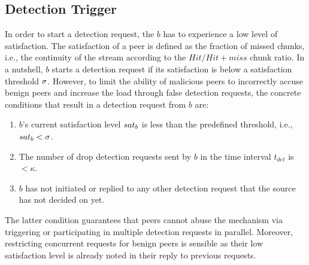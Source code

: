 \subsection{Detection Trigger}
\label{Detection-Trigger}


In order to start a detection request, the $b$ has to experience a low level of satisfaction. 
The satisfaction of a peer is defined as the fraction of missed chunks, i.e., the continuity of the stream according to the $Hit/Hit+miss$ chunk ratio.
In a nutshell, $b$ starts a detection request if its satisfaction is below a satisfaction threshold $\sigma$.
However, to limit the ability of malicious peers to incorrectly accuse benign peers and increase the load through false detection requests, the concrete conditions that result in a detection request from $b$ are: 


\begin{enumerate}
 \item $b$'s current satisfaction level $sat_b$ is less than the predefined threshold, i.e., $sat_b < \sigma$.
 \item The number of drop detection requests sent by $b$ in the time interval $t_{det}$ is $< \kappa$. 
 \item $b$ has not initiated or replied to any other \drop detection request that the source has not decided on yet.
\end{enumerate}
The latter condition guarantees that peers cannot abuse the mechanism via triggering or participating in multiple detection requests in parallel. 
Moreover, restricting concurrent requests for benign peers is sensible as their low satisfaction level is already noted in their reply to previous requests.

